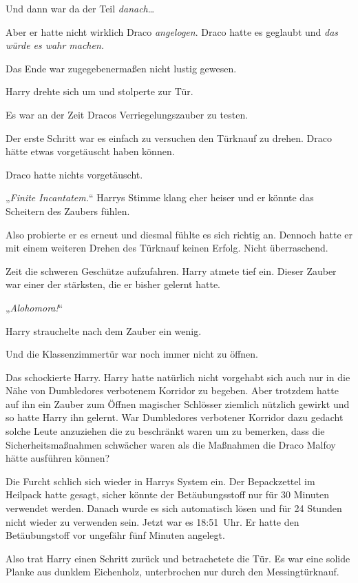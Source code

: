 {Und dann war da der Teil \emph{danach}…

Aber er hatte nicht wirklich Draco \emph{angelogen}. Draco hatte es geglaubt und \emph{das würde es wahr machen.}

Das Ende war zugegebenermaßen nicht lustig gewesen.

Harry drehte sich um und stolperte zur Tür.

Es war an der Zeit Dracos Verriegelungszauber zu testen.

Der erste Schritt war es einfach zu versuchen den Türknauf zu drehen. Draco hätte etwas vorgetäuscht haben können.

Draco hatte nichts vorgetäuscht.

„\emph{Finite Incantatem.}“ Harrys Stimme klang eher heiser und er könnte das Scheitern des Zaubers fühlen.

Also probierte er es erneut und diesmal fühlte es sich richtig an. Dennoch hatte er mit einem weiteren Drehen des Türknauf keinen Erfolg. Nicht überraschend.

Zeit die schweren Geschütze aufzufahren. Harry atmete tief ein. Dieser Zauber war einer der stärksten, die er bisher gelernt hatte.

„\emph{Alohomora!}“

Harry strauchelte nach dem Zauber ein wenig.

Und die Klassenzimmertür war noch immer nicht zu öffnen.

Das schockierte Harry. Harry hatte natürlich nicht vorgehabt sich auch nur in die Nähe von Dumbledores verbotenem Korridor zu begeben. Aber trotzdem hatte auf ihn ein Zauber zum Öffnen magischer Schlösser ziemlich nützlich gewirkt und so hatte Harry ihn gelernt. War Dumbledores verbotener Korridor dazu gedacht solche Leute anzuziehen die zu beschränkt waren um zu bemerken, dass die Sicherheitsmaßnahmen schwächer waren als die Maßnahmen die Draco Malfoy hätte ausführen können?

Die Furcht schlich sich wieder in Harrys System ein. Der Bepackzettel im Heilpack hatte gesagt, sicher könnte der Betäubungsstoff nur für 30 Minuten verwendet werden. Danach wurde es sich automatisch lösen und für 24 Stunden nicht wieder zu verwenden sein. Jetzt war es 18:51~Uhr. Er hatte den Betäubungstoff vor ungefähr fünf Minuten angelegt.

Also trat Harry einen Schritt zurück und betrachetete die Tür. Es war eine solide Planke aus dunklem Eichenholz, unterbrochen nur durch den Messingtürknauf.

}
